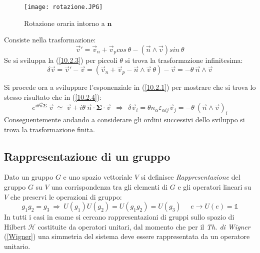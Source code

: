 \documentclass[twoside]{article}
\renewcommand{\vec}[1]{\textbf{#1}}
\begin{document}
\begin{figure}[hb]
\begin{center}
\texttt{[image: rotazione.JPG]}
\end{center}
\caption{Rotazione oraria intorno a $\vec{n}$}
\label{rot}
\end{figure}

Consiste nella trasformazione:
\begin{equation} \label{10.2.3}
    \Vec{v}'=\Vec{v}_n+\Vec{v}_p cos \ \theta - (\Vec{n}\wedge\Vec{v})sin \ \theta
\end{equation}
Se si sviluppa la (\ref{10.2.3}) per piccoli $\theta$ si trova la trasformazione infinitesima:
\begin{equation} \label{10.2.4}
    \delta \Vec{v}=\Vec{v}'-\Vec{v}=(\Vec{v}_n + \Vec{v}_p - \Vec{n}\wedge\Vec{v} \ \theta)-\Vec{v}=-\theta \ \Vec{n} \wedge \Vec{v}
\end{equation}

Si procede ora a sviluppare l'esponenziale in (\ref{10.2.1}) per mostrare che si trova lo stesso risultato che in (\ref{10.2.4}):
\begin{equation}
    e^{i\theta \Vec{n}\bm{\Sigma}} \ \Vec{v} \ \simeq \ \Vec{v}+i\theta \ \Vec{n}\cdot \bm{\Sigma} \cdot \Vec{v} \ \ \Rightarrow \ \ \delta \Vec{v}_i=\theta n_{\alpha}\varepsilon_{\alpha i j}\Vec{v}_j=-\theta \ (\Vec{n}\wedge\Vec{v})_i
\end{equation}
Conseguentemente andando a considerare gli ordini successivi dello sviluppo si trova la trasformazione finita.

\vspace{0.5cm}
\subsection{Rappresentazione di un gruppo}

Dato un gruppo $G$ e uno spazio vettoriale $V$ si definisce \textit{Rappresentazione} del gruppo $G$ su $V$ una corrispondenza tra gli elementi di $G$ e gli operatori lineari su $V$ che preservi le operazioni di gruppo:
\begin{equation}
    g_1 g_2 =g_3 \ \Rightarrow \ U(g_1)U(g_2)=U(g_1 g_2)=U(g_3) \ \ \ \ \ \ e\to U(e)=\mathds{1}
\end{equation}
In tutti i casi in esame si cercano rappresentazioni di gruppi sullo spazio di Hilbert $\mathcal{H}$ costituite da operatori unitari, dal momento che per il \textit{Th. di Wigner} (\ref{Wigner}) una simmetria del sistema deve essere rappresentata da un operatore unitario.
\end{document}
